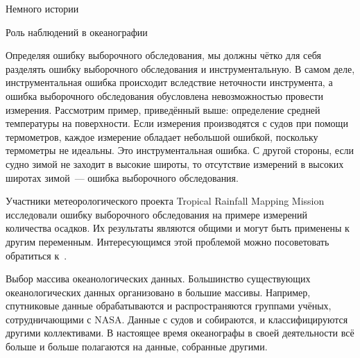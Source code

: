 \begin{chapter}{Немного истории}
\begin{section}{Роль наблюдений в океанографии}
{{Определяя ошибку выборочного обследования, мы должны чётко для себя разделять 
ошибку выборочного обследования и инструментальную. В самом деле,
инструментальная ошибка происходит вследствие неточности инструмента,
а ошибка выборочного обследования обусловлена невозможностью провести 
измерения. Рассмотрим пример, приведённый выше: определение средней температуры 
на поверхности. Если измерения производятся с судов при помощи термометров, 
каждое измерение обладает небольшой ошибкой, поскольку термометры не идеальны. 
Это инструментальная ошибка. С другой стороны, если судно зимой не заходит 
в высокие широты, то отсутствие  измерений в высоких широтах зимой~--- ошибка 
выборочного обследования.
%

Участники метеорологического проекта Tropical Rainfall Mapping Mission 
исследовали ошибку выборочного обследования на примере измерений количества осадков. 
Их результаты являются общими и могут быть применены к другим переменным. 
Интересующимся этой проблемой можно посоветовать обратиться к~\cite{North:1989}.
%
}%
}

\begin{paragraph}{Выбор массива океанологических данных.}
Большинство существующих
океанологических данных организовано в большие массивы.
Например, спутниковые данные обрабатываются и распространяются
группами учёных, сотрудничающими с NASA. Данные с судов и собираются, и
классифицируются другими коллективами. В настоящее время океанографы в своей 
деятельности всё больше и больше полагаются на данные, собранные другими.
%



\end{paragraph}
\end{section}
\end{chapter}
